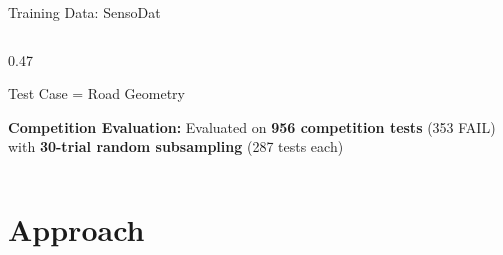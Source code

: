 \documentclass[aspectratio=169, 11pt]{beamer}
\begin{document}
\begin{frame}{Training Data: SensoDat}
\begin{columns}[T]
\begin{column}{0.47\textwidth}
\begin{block}{Test Case = Road Geometry}
  \end{block}
  
  \vspace{0.3em}
  {\small\textbf{Competition Evaluation:} Evaluated on \textbf{956 competition tests} (353 FAIL)
  with \textbf{30-trial random subsampling} (287 tests each)}
\end{column}
\end{columns}
\end{frame}

\section{Approach}
\end{document}
